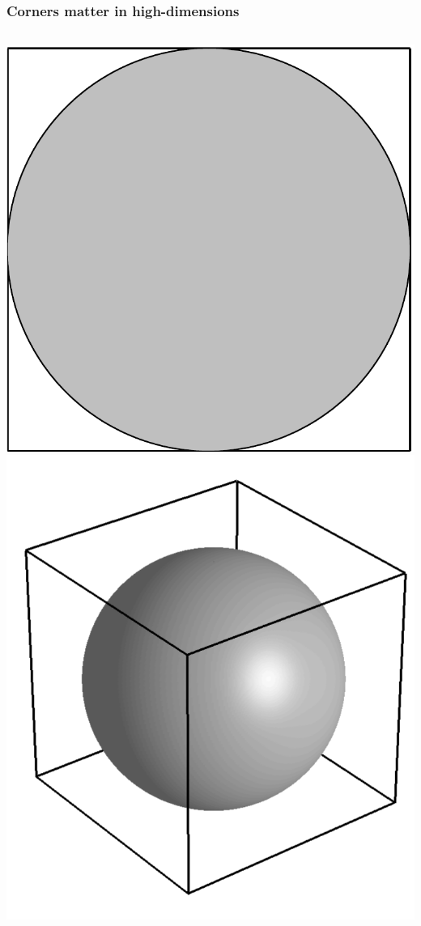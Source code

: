 \begin{frame}
\frametitle{Corners matter in high-dimensions}
\begin{columns}[c]
\includegraphics[width=\textwidth]{circle}
\includegraphics[width=\textwidth]{sphere}
\end{columns}
\end{frame}

